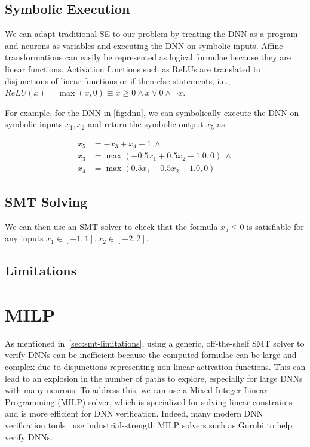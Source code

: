 \documentclass[oneside,11pt,dvipsnames]{book}
\numberwithin{equation}{section}
\theoremstyle{definition}
\theoremstyle{remark}
\begin{document}
\subsection{Symbolic Execution}\label{sec:se}
We can adapt traditional SE to our problem by treating the DNN as a program and neurons as variables and executing the DNN on symbolic inputs. Affine transformations can easily be represented as logical formulae because they are linear functions. Activation functions such as ReLUs are translated to disjunctions of linear functions or if-then-else statements, i.e., $ReLU(x) = \max(x,0) \equiv x \ge 0 \land x \lor 0 \land \neg x$.


For example, for the DNN in \autoref{fig:dnn}, we can symbolically execute the DNN on symbolic inputs $x_1,x_2$ and return the symbolic output $x_5$ as 

\begin{equation}
    \begin{split}
x_5 &= -x_3 + x_4 - 1 ~\land \\
x_3 &= \max(-0.5x_1 + 0.5x_2 + 1.0, 0) ~\land \\
x_4 &= \max(0.5x_1 - 0.5x_2 - 1.0, 0)
    \end{split}
\end{equation}


\subsection{SMT Solving}\label{sec:smt}
We can then use an SMT solver to check that the formula $x_5 \le 0$ is satisfiable for any inputs $x_1 \in [-1,1], x_2\in[-2,2]$.


\subsection{Limitations}\label{sec:smt-limitations} 
\section{MILP}

As mentioned in~\autoref{sec:smt-limitations}, using a generic, off-the-shelf SMT solver to verify DNNs can be inefficient because the computed formulae can be large and complex due to disjunctions representing non-linear activation functions.  This can lead to an explosion in the number of paths to explore, especially for large DNNs with many neurons.
To address this, we can use a Mixed Integer Linear Programming (MILP) solver, which is specialized for solving linear constraints and is more efficient for DNN verification. Indeed, many modern DNN verification tools~\cite{wang2018efficient,katz2017reluplex,henriksen2020efficient} use industrial-strength MILP solvers such as Gurobi to help verify DNNs.
\end{document}

